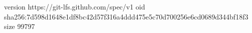 version https://git-lfs.github.com/spec/v1
oid sha256:7d598d1648e1df8bc42d57f316a4ddd475e5c70d700256e6cd0689d344bf18f3
size 99797
